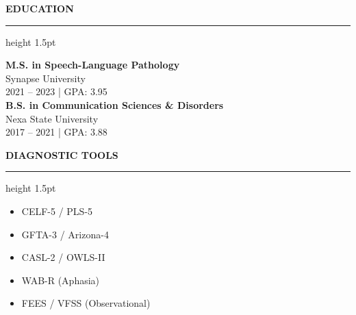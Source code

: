 \documentclass[10pt]{article}
\newcommand{\cvsection}[1]{%
  \vspace{10pt}%
  {\color{primary}\large\bfseries\MakeUppercase{#1}}%
  \vspace{3pt}%
  {\color{primary}\hrule height 1.5pt}%
  \vspace{6pt}%
}
\begin{document}
\begin{minipage}[t]{0.34\textwidth}
  \cvsection{Education}
  \textbf{M.S. in Speech-Language Pathology} \\
  {\color{secondary}\small Synapse University} \\
  {\color{secondary}\footnotesize 2021 -- 2023 | GPA: 3.95} \\
  
  \vspace{4pt}
  \textbf{B.S. in Communication Sciences \& Disorders} \\
  {\color{secondary}\small Nexa State University} \\
  {\color{secondary}\footnotesize 2017 -- 2021 | GPA: 3.88}
  
  \cvsection{Diagnostic Tools}
  \begin{itemize}[parsep=1.5pt]
    \item CELF-5 / PLS-5
    \item GFTA-3 / Arizona-4
    \item CASL-2 / OWLS-II
    \item WAB-R (Aphasia)
    \item FEES / VFSS (Observational)
  \end{itemize}
\end{minipage}
\end{document}
